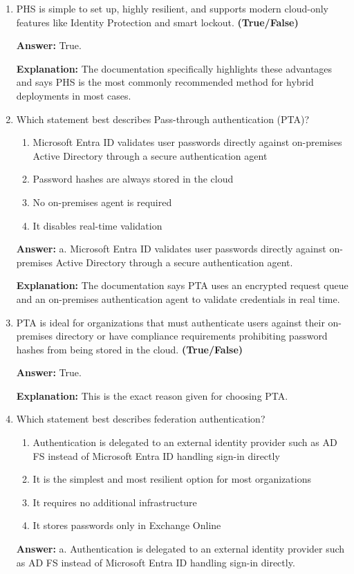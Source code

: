 \documentclass[10pt]{article}
\begin{document}
\begin{enumerate}[leftmargin=*]
\textbf{Explanation:} This is the exact description given for PHS.

\item PHS is simple to set up, highly resilient, and supports modern cloud-only features like Identity Protection and smart lockout. \textbf{(True/False)}

\textbf{Answer:} True.

\textbf{Explanation:} The documentation specifically highlights these advantages and says PHS is the most commonly recommended method for hybrid deployments in most cases.

\item Which statement best describes Pass-through authentication (PTA)?
\begin{enumerate}[label=\alph*., leftmargin=1.5em]
\item Microsoft Entra ID validates user passwords directly against on-premises Active Directory through a secure authentication agent
\item Password hashes are always stored in the cloud
\item No on-premises agent is required
\item It disables real-time validation
\end{enumerate}
\textbf{Answer:} a. Microsoft Entra ID validates user passwords directly against on-premises Active Directory through a secure authentication agent.

\textbf{Explanation:} The documentation says PTA uses an encrypted request queue and an on-premises authentication agent to validate credentials in real time.

\item PTA is ideal for organizations that must authenticate users against their on-premises directory or have compliance requirements prohibiting password hashes from being stored in the cloud. \textbf{(True/False)}

\textbf{Answer:} True.

\textbf{Explanation:} This is the exact reason given for choosing PTA.

\item Which statement best describes federation authentication?
\begin{enumerate}[label=\alph*., leftmargin=1.5em]
\item Authentication is delegated to an external identity provider such as AD FS instead of Microsoft Entra ID handling sign-in directly
\item It is the simplest and most resilient option for most organizations
\item It requires no additional infrastructure
\item It stores passwords only in Exchange Online
\end{enumerate}
\textbf{Answer:} a. Authentication is delegated to an external identity provider such as AD FS instead of Microsoft Entra ID handling sign-in directly.


\end{enumerate}
\end{document}

